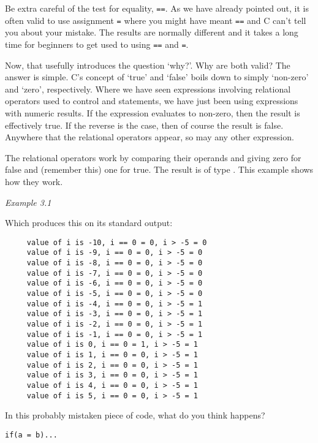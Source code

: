    Be extra careful of the test for equality, \texttt{==}. As we have
    already pointed out, it is often valid to use assignment \texttt{=}
    where you might have meant \texttt{==} and C can't tell you about your
    mistake. The results are normally different and it takes a long time for
    beginners to get used to using \texttt{==} and \texttt{=}.


   Now, that usefully introduces the question `why?'. Why are both
    valid?  The answer is simple. C's concept of `true' and
    `false' boils down to simply `non-zero' and `zero',
    respectively. Where we have seen expressions involving relational
    operators used to control \kdo{} and \kif{}
    statements, we have just been using expressions with numeric results. If
    the expression evaluates to non-zero, then the result is effectively
    true. If the reverse is the case, then of course the result is false.
    Anywhere that the relational operators appear, so may any other
    expression.


   The relational operators work by comparing their operands and giving
    zero for false and (remember this) one for true. The result is of type
    \kint. This example shows how they work.


   \begin{center}\textit{Example 3.1}\end{center}


   Which produces this on its standard output:


   \begin{Verbatim}
     value of i is -10, i == 0 = 0, i > -5 = 0
     value of i is -9, i == 0 = 0, i > -5 = 0
     value of i is -8, i == 0 = 0, i > -5 = 0
     value of i is -7, i == 0 = 0, i > -5 = 0
     value of i is -6, i == 0 = 0, i > -5 = 0
     value of i is -5, i == 0 = 0, i > -5 = 0
     value of i is -4, i == 0 = 0, i > -5 = 1
     value of i is -3, i == 0 = 0, i > -5 = 1
     value of i is -2, i == 0 = 0, i > -5 = 1
     value of i is -1, i == 0 = 0, i > -5 = 1
     value of i is 0, i == 0 = 1, i > -5 = 1
     value of i is 1, i == 0 = 0, i > -5 = 1
     value of i is 2, i == 0 = 0, i > -5 = 1
     value of i is 3, i == 0 = 0, i > -5 = 1
     value of i is 4, i == 0 = 0, i > -5 = 1
     value of i is 5, i == 0 = 0, i > -5 = 1
   \end{Verbatim}

   In this probably mistaken piece of code, what do you think happens?


   \begin{Verbatim}
if(a = b)...
\end{Verbatim}

